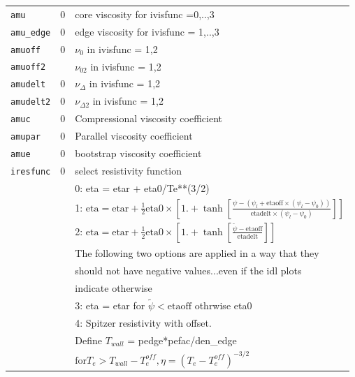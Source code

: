 \begin{tabular}{llp{4.0in}}
  \texttt{amu}       & 0 & core viscosity for ivisfunc =0,..,3 \\
  \texttt{amu\_edge} & 0 & edge viscosity for ivisfunc = 1,..,3 \\
  \texttt{amuoff}    & 0 & $\nu_0$ in ivisfunc = 1,2 \\
  \texttt{amuoff2}   &   & $\nu_{02}$ in ivisfunc = 1,2 \\
  \texttt{amudelt}   & 0 & $\nu_{\Delta}$ in ivisfunc = 1,2 \\
  \texttt{amudelt2}  & 0 & $\nu_{\Delta2}$ in ivisfunc = 1,2 \\
  \texttt{amuc}   & 0 & Compressional viscosity coefficient\\
  \texttt{amupar} & 0 & Parallel viscosity coefficient \\
  \texttt{amue}  & 0 & bootstrap viscosity coefficient \\
  \hline
  \texttt{iresfunc} & 0 & select resistivity function  \\
                    &   & 0: eta = etar + eta0/Te**(3/2) \\
                    &   & 1: $ \mbox{eta} = \mbox{etar} + \frac{1}{2} \mbox{eta0} \times
                 \left[ 1. + \tanh \left[   \frac{\psi - \left( \psi_l+\mbox{etaoff} \times (\psi_l - \psi_0)\right)}
                                                 {\mbox{etadelt}\times (\psi_l - \psi_0)                   }\right] \right] $  \\
                    &   & 2:  $ \mbox{eta} = \mbox{etar} + \frac{1}{2} \mbox{eta0} \times
                 \left[ 1. + \tanh \left[   \frac{\tilde{\psi} - \mbox{etaoff}}
                                                 {\mbox{etadelt}}  \right] \right] $  \\
                    &   & The following two options are applied in a way that they \\ 
                    &   & should not have negative values...even if the idl plots \\
                    &   & indicate otherwise \\
                    &   & 3: eta = etar for $\tilde{\psi} < \mbox{etaoff}$ othrwise eta0  \\
                    &   & 4:  Spitzer resistivity with offset. \\
                    &   &     Define $T_{wall}$ = pedge*pefac/den\_edge \\
                    &   & $\mbox{for} T_e > T_{wall} - T_e^{off}, \eta = (T_e-T_e^{off})^{-3/2} $ \\

\end{tabular}
